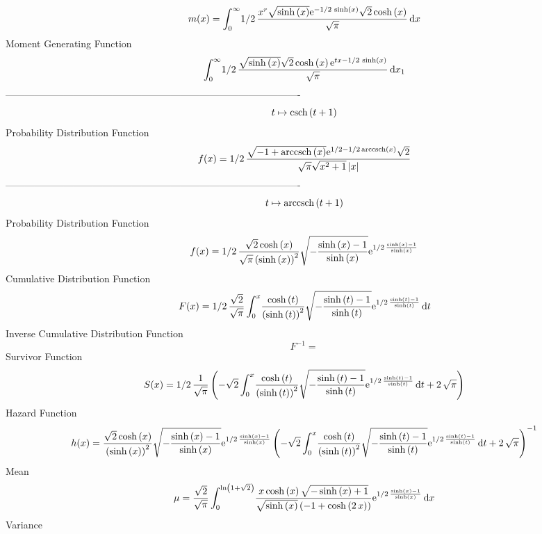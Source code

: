 \documentclass[12pt]{article}
\begin{document}
 $$ m(x) = \int_{0}^{\infty }\!1/2\,{\frac {{x}^{r}\sqrt {\sinh \left( x \right) 
}{{\rm e}^{-1/2\,\sinh \left( x \right) }}\sqrt {2}\cosh \left( x
 \right) }{\sqrt {\pi}}}\,{\rm d}x
$$ Moment Generating Function 
 $$\int_{0}^{\infty }\!1/2\,{\frac {\sqrt {\sinh \left( x \right) }\sqrt 
{2}\cosh \left( x \right) {{\rm e}^{tx-1/2\,\sinh \left( x \right) }}
}{\sqrt {\pi}}}\,{\rm d}x_{{1}}
$$-------------------------------------------------------------------------------------------  \\$$t\mapsto {\rm csch} \left(t+1\right)
$$Probability Distribution Function 
$$  f(x)=1/2\,{\frac {\sqrt {-1+{\rm arccsch} \left(x\right)}{{\rm e}^{1/2-1/2
\,{\rm arccsch} \left(x\right)}}\sqrt {2}}{\sqrt {\pi}\sqrt {{x}^{2}+1
} \left| x \right| }}
$$-------------------------------------------------------------------------------------------  \\$$t\mapsto {\rm arccsch} \left(t+1\right)
$$Probability Distribution Function 
$$  f(x)=1/2\,{\frac {\sqrt {2}\cosh \left( x \right) }{\sqrt {\pi} \left( 
\sinh \left( x \right)  \right) ^{2}}\sqrt {-{\frac {\sinh \left( x
 \right) -1}{\sinh \left( x \right) }}}{{\rm e}^{1/2\,{\frac {\sinh
 \left( x \right) -1}{\sinh \left( x \right) }}}}}
$$Cumulative Distribution Function  
 $$F(x)=1/2\,{\frac {\sqrt {2}}{\sqrt {\pi}}\int_{0}^{x}\!{\frac {\cosh
 \left( t \right) }{ \left( \sinh \left( t \right)  \right) ^{2}}
\sqrt {-{\frac {\sinh \left( t \right) -1}{\sinh \left( t \right) }}}{
{\rm e}^{1/2\,{\frac {\sinh \left( t \right) -1}{\sinh \left( t
 \right) }}}}}\,{\rm d}t}
$$ Inverse Cumulative Distribution Function 
  $$F^{-1} = $$Survivor Function 
 $$ S(x)=1/2\,{\frac {1}{\sqrt {\pi}} \left( -\sqrt {2}\int_{0}^{x}\!{\frac {
\cosh \left( t \right) }{ \left( \sinh \left( t \right)  \right) ^{2}}
\sqrt {-{\frac {\sinh \left( t \right) -1}{\sinh \left( t \right) }}}{
{\rm e}^{1/2\,{\frac {\sinh \left( t \right) -1}{\sinh \left( t
 \right) }}}}}\,{\rm d}t+2\,\sqrt {\pi} \right) }
$$ Hazard Function 
 $$ h(x)={\frac {\sqrt {2}\cosh \left( x \right) }{ \left( \sinh \left( x
 \right)  \right) ^{2}}\sqrt {-{\frac {\sinh \left( x \right) -1}{
\sinh \left( x \right) }}}{{\rm e}^{1/2\,{\frac {\sinh \left( x
 \right) -1}{\sinh \left( x \right) }}}} \left( -\sqrt {2}\int_{0}^{x}
\!{\frac {\cosh \left( t \right) }{ \left( \sinh \left( t \right) 
 \right) ^{2}}\sqrt {-{\frac {\sinh \left( t \right) -1}{\sinh \left( 
t \right) }}}{{\rm e}^{1/2\,{\frac {\sinh \left( t \right) -1}{\sinh
 \left( t \right) }}}}}\,{\rm d}t+2\,\sqrt {\pi} \right) ^{-1}}
$$Mean 
 $$ \mu={\frac {\sqrt {2}}{\sqrt {\pi}}\int_{0}^{\ln  \left( 1+\sqrt {2}
 \right) }\!{\frac {x\cosh \left( x \right) \sqrt {-\sinh \left( x
 \right) +1}}{\sqrt {\sinh \left( x \right) } \left( -1+\cosh \left( 2
\,x \right)  \right) }{{\rm e}^{1/2\,{\frac {\sinh \left( x \right) -1
}{\sinh \left( x \right) }}}}}\,{\rm d}x}
$$ Variance 
\end{document}
